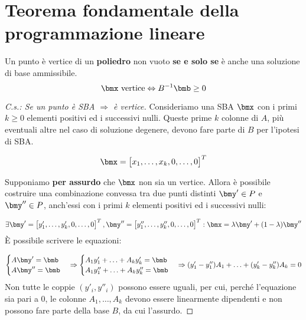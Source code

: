 \documentclass[\main/main.tex]{subfiles}
\begin{document}
\section{Teorema fondamentale della programmazione lineare}

\begin{theorem}
  Un punto è vertice di un \textbf{poliedro} non vuoto \textbf{se e solo se} è anche una soluzione di base ammissibile.
  \[
    \bmx \text{ vertice} \Leftrightarrow B^{-1}\bmb\geq 0
  \]
\end{theorem}

\begin{proof}[C.s.: Se un punto è SBA $\Rightarrow$ è vertice]
  Consideriamo una SBA $\bmx$ con i primi $k \geq 0$ elementi positivi ed i successivi nulli. Queste prime $k$ colonne di $A$, più eventuali altre nel caso di soluzione degenere, devono fare parte di $B$ per l'ipotesi di SBA.

  \[
    \bmx = \begin{bmatrix}
      x_1, \ldots, x_k, 0, \ldots, 0
    \end{bmatrix}^T
  \]

  Supponiamo \textbf{per assurdo} che $\bmx$ non sia un vertice. Allora è possibile costruire una combinazione convessa tra due punti distinti $\bmy' \in P$ e $\bmy'' \in P$, anch'essi con i primi $k$ elementi positivi ed i successivi nulli:

  \[
    \exists \bmy' = \begin{bmatrix}
      y'_1, \ldots, y'_k, 0, \ldots, 0
    \end{bmatrix}^T,
    \bmy'' = \begin{bmatrix}
      y''_1, \ldots, y''_k, 0, \ldots, 0
    \end{bmatrix}^T:
    \bmx = \lambda \bmy' + (1-\lambda)\bmy''
  \]
  È possibile scrivere le equazioni:

  \[
    \begin{cases}
      A\bmy' = \bmb  \\
      A\bmy'' = \bmb \\
    \end{cases}
    \Rightarrow
    \begin{cases}
      A_1y'_1 + \ldots + A_ky'_k = \bmb   \\
      A_1y''_1 + \ldots + A_ky''_k = \bmb \\
    \end{cases}
    \Rightarrow
    (y'_1 - y''_1)A_1 + \ldots + (y'_k -y''_k)A_k = 0
  \]
  Non tutte le coppie $(y'_i, y''_i)$ possono essere uguali, per cui, perché l'equazione sia pari a $0$, le colonne $A_1, \ldots, A_k$ devono essere linearmente dipendenti e non possono fare parte della base $B$, da cui l'assurdo.
\end{proof}
\end{document}
